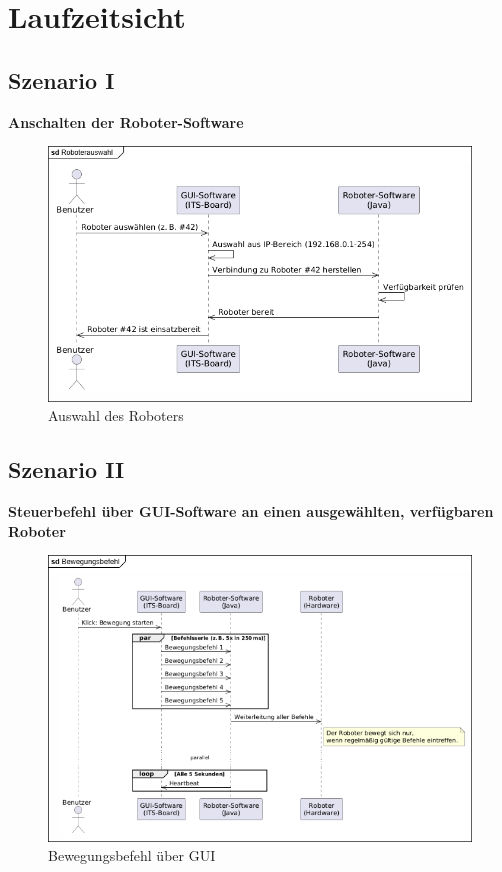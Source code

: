 
\chapter{Laufzeitsicht}

\section{Szenario I}
\textbf{Anschalten der Roboter-Software}\\

\begin{figure}[h]
    \centering
    \includegraphics[width=0.8\linewidth]{diagrams/Roboterauswahl.png}
    \caption{Auswahl des Roboters}
    \label{fig:Auswahl}
\end{figure}

\clearpage
\section{Szenario II}
\textbf{Steuerbefehl über GUI-Software an einen ausgewählten, verfügbaren Roboter}\\

\begin{figure}[h]  
    \centering
    \includegraphics[width=0.8\linewidth]{diagrams/Bewegungsbefehl.png}
    \caption{Bewegungsbefehl über GUI}
    \label{fig:Bewegungsbefehl}
\end{figure}





